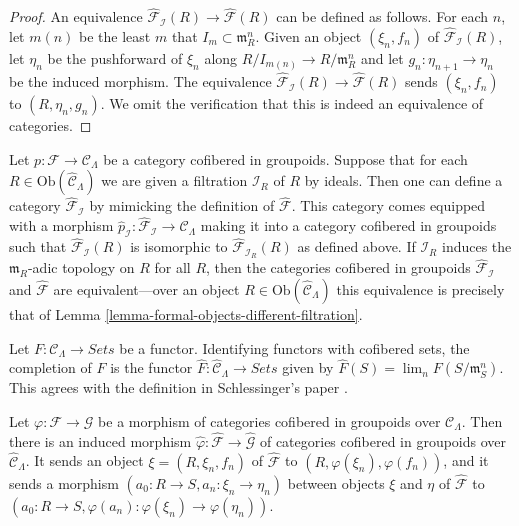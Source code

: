 \begin{proof}
An equivalence $\widehat{\mathcal{F}}_{\mathcal I}(R) \to 
\widehat{\mathcal{F}}(R)$ can be defined as follows.  For each $n$, let $m(n)$ 
be the least $m$ that $I_{m} \subset \mathfrak{m}_{R}^{n}$.  Given an object 
$(\xi_n,f_n)$ of $\widehat{\mathcal{F}}_{\mathcal I}(R)$, let $\eta_{n}$ be the 
pushforward of $\xi_{n}$ along $R/I_{m(n)} \to R/\mathfrak{m}_{R}^{n}$ 
and let $g_{n}: \eta_{n+1} \to \eta_{n}$ be the induced morphism.  The 
equivalence $\widehat{\mathcal{F}}_{\mathcal I}(R) \to 
\widehat{\mathcal{F}}(R)$ sends $(\xi_n,f_n)$ to $(R,\eta_n,g_n)$.  We omit the 
verification that this is indeed an equivalence of categories.
\end{proof}

\begin{remark}
\label{remark-different-sequence-ideals}
Let $p: \mathcal{F} \to \mathcal{C}_\Lambda$ be a category cofibered in 
groupoids.  Suppose that for each $R \in \text{Ob}(\widehat{\mathcal 
C}_\Lambda)$ we are given a filtration $\mathcal I_{R}$ of $R$ by ideals.  
Then one can define a category $\widehat{\mathcal{F}}_{\mathcal I}$ by mimicking 
the definition of $\widehat{\mathcal{F}}$.  This category comes equipped with a 
morphism $\widehat{p}_{\mathcal I}: \widehat{\mathcal{F}}_{\mathcal I} 
\to \mathcal{C}_\Lambda$ making it into a category cofibered in 
groupoids such that $\widehat{\mathcal{F}}_{\mathcal I}(R)$ is isomorphic to 
$\widehat{\mathcal{F}}_{\mathcal I_{R}}(R)$ as defined above. If $\mathcal 
I_{R}$ induces the $\mathfrak{m}_{R}$-adic topology on $R$ for all $R$, then 
the categories cofibered in groupoids $\widehat{\mathcal{F}}_{\mathcal I}$ and 
$\widehat{\mathcal{F}}$ are equivalent---over an object $R \in 
\text{Ob}(\widehat{\mathcal{C}}_\Lambda)$ this equivalence is precisely 
that of Lemma \ref{lemma-formal-objects-different-filtration}.
\end{remark}

\begin{remark}
\label{remark-completion-functor}
Let $F: \mathcal{C}_\Lambda \to \textit{Sets}$ be a functor.  
Identifying functors with cofibered sets, the completion of $F$ is the functor 
$\widehat{F}: \widehat{\mathcal{C}}_\Lambda \to \textit{Sets}$ 
given by $\widehat{F}(S) = \lim_{n} F(S/\mathfrak{m}_{S}^{n})$.  This agrees 
with the definition in Schlessinger's paper \cite{Sch}.
\end{remark}

\begin{remark}
\label{remark-completion-morphism}
Let $\varphi: \mathcal{F} \to \mathcal G$ be a morphism of categories 
cofibered in groupoids over $\mathcal{C}_\Lambda$.  Then there is an induced 
morphism $\widehat{\varphi}: \widehat{\mathcal{F}} \to  
\widehat{\mathcal G}$ of categories cofibered in groupoids over 
$\widehat{\mathcal{C}}_\Lambda$. It sends an object $\xi = (R, \xi_n, f_n)$ of 
$\widehat{\mathcal{F}}$ to $(R, \varphi(\xi_n), \varphi(f_n))$, and it sends a 
morphism $(a_0: R \to S, a_n: \xi_n \to \eta_n)$ between 
objects $\xi$ and $\eta$ of $\widehat{\mathcal{F}}$ to $(a_0: R \to S, 
\varphi(a_n): \varphi(\xi_n) \to \varphi(\eta_n))$.
\end{remark} 

